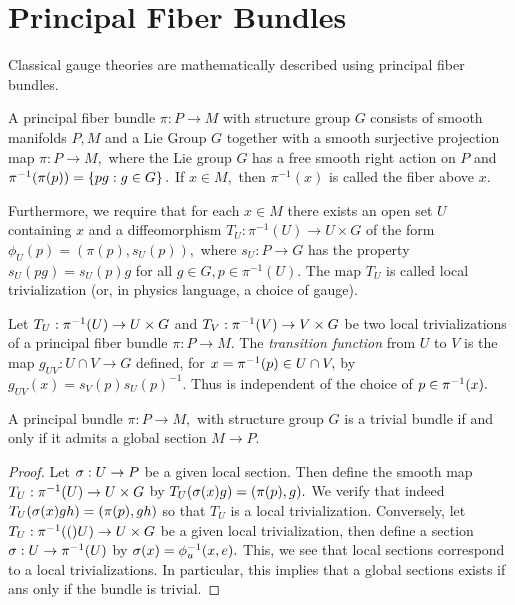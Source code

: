 \section{Principal Fiber Bundles}

Classical gauge theories are mathematically described using principal fiber bundles.

\begin{defn}[\cite{DB}, 1.1.1]
 \label{JB:2.1}
 A principal fiber bundle $\pi: P \to M$ with structure group $G$ consists of smooth manifolds $P, M$ and a Lie Group
$G$ together with a smooth surjective projection map $\pi: P \to M,$ where the Lie group $G$ has a free smooth right
action on $P$ and $\pi^{-1}(\pi(p))=\left\{ pg : g \in G \right\}.$ If $x \in M,$ then $\pi^{-1}(x)$ is called the fiber above $x.$

Furthermore, we require that for each $x \in M$ there exists an open set $U$ containing $x$ and a diffeomorphism
$T_{U}: \pi^{-1}(U) \to U \times G$ of the form $\phi_{U}(p)=(\pi(p), s_{U}(p)),$ where $s_{U}: P \to G$ has the
property $s_{U}(pg)=s_{U}(p)g$ for all $g \in G, p \in \pi^{-1}(U).$
The map $T_{U}$ is called local trivialization (or, in physics language, a choice of gauge).
\end{defn}

Let $T_{U}: \pi^{-1}(U) \to U\times G$ and $T_{V}:\pi^{-1}(V) \to V \times G$ be two local trivializations of a principal
fiber bundle $\pi : P \to M.$ The \emph{transition function} from $U$ to $V$ is the map $g_{UV}: U \cap V \to G$
defined, for $x = \pi^{-1}(p) \in U \cap V,$ by $g_{UV}(x)=s_{V}(p)s_{U}(p)^{-1}.$ Thus is independent of the choice of $p
\in \pi^{-1}(x).$

\begin{thm}[\cite{DB}, 1.1.5]
 \label{JB:2.2}
A principal bundle $\pi: P \to M,$ with structure group $G$ is a trivial bundle if and
only if it admits a global section $M \to P.$ 
\end{thm}


\begin{proof}
 Let $ \sigma: U \to P$ be a given local section. Then define the smooth map $T_{U}: \pi^{-1}(U) \to U \times G$ by
$T_{U}(\sigma(x)g)=(\pi(p), g).$ We verify that indeed $T_{U}(\sigma(x)gh)=(\pi(p), gh)$ so that $T_{U}$ is a local
trivialization. Conversely, let $T_{U}: \pi^{-1}(()U) \to U \times G$ be a given local trivialization, then define a section
$\sigma : U \to \pi^{-1}(U)$ by $\sigma(x)=\phi_{u}^{-1}(x,e).$ This, we see that local sections correspond to a local
trivializations. In particular, this implies that a global sections exists if ans only if the bundle is trivial.
\end{proof}

